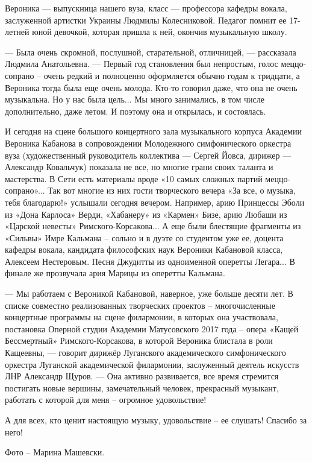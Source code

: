 Вероника — выпускница нашего вуза, класс — профессора кафедры вокала,
заслуженной артистки Украины Людмилы Колесниковой. Педагог помнит ее 17-летней
юной девочкой, которая пришла к ней, окончив музыкальную школу. 

— Была очень скромной, послушной, старательной, отличницей, — рассказала
Людмила Анатольевна. — Первый год становления был непростым, голос
меццо-сопрано – очень редкий и полноценно оформляется обычно годам к тридцати,
а Вероника тогда была еще очень молода. Кто-то говорил даже, что она не очень
музыкальна. Но у нас была цель... Мы много занимались, в том числе дополнительно,
даже летом. И поэтому она и открылась, и состоялась.


И сегодня на сцене большого концертного зала музыкального корпуса Академии
Вероника Кабанова в сопровождении Молодежного симфонического оркестра вуза
(художественный руководитель коллектива — Сергей Йовса, дирижер — Александр
Ковальчук) показала не все, но многие грани своих таланта и мастерства. В Сети
есть материалы вроде «10 самых сложных партий меццо-сопрано»... Так вот многие из
них гости творческого вечера «За все, о музыка, тебя благодарю!» услышали
сегодня вечером. Например, арию Принцессы Эболи из «Дона Карлоса» Верди,
«Хабанеру» из «Кармен» Бизе, арию Любаши из «Царской невесты»
Римского-Корсакова... А еще были блестящие фрагменты из «Сильвы» Имре Кальмана –
сольно и в дуэте со студентом уже ее, доцента кафедры вокала, кандидата
философских наук Вероники Кабановой класса, Алексеем Нестеровым. Песня Джудитты
из одноименной оперетты Легара... В финале же прозвучала ария Марицы из оперетты
Кальмана.

— Мы работаем с Вероникой Кабановой, наверное, уже больше десяти лет. В списке
совместно реализованных творческих проектов – многочисленные концертные
программы на сцене филармонии, в которых она участвовала, постановка Оперной
студии Академии Матусовского 2017 года – опера «Кащей Бессмертный»
Римского-Корсакова, в которой Вероника блистала в роли Кащеевны, — говорит
дирижёр Луганского академического симфонического оркестра Луганской
академической филармонии, заслуженный деятель искусств ЛНР Александр Щуров. —
Она активно развивается, все время стремится постигать новые вершины,
замечательный человек, прекрасный музыкант, работать с которой для меня –
огромное удовольствие!

А для всех, кто ценит настоящую музыку, удовольствие – ее слушать! Спасибо за
него!

Фото –  Марина Машевски.
